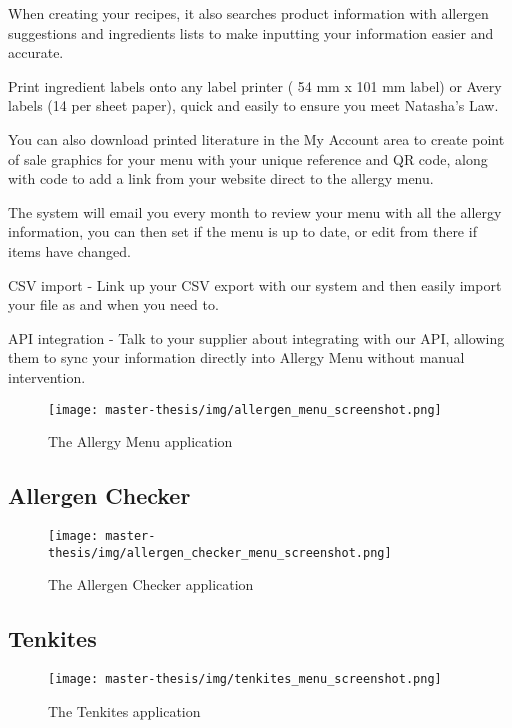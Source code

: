 When creating your recipes, it also searches product information with allergen suggestions and ingredients lists to make inputting your information easier and accurate.

Print ingredient labels onto any label printer ( 54 mm x 101 mm label) or Avery labels (14 per sheet paper), quick and easily to ensure you meet Natasha's Law.

You can also download printed literature in the My Account area to create point of sale graphics for your menu with your unique reference and QR code, along with code to add a link from your website direct to the allergy menu.

The system will email you every month to review your menu with all the allergy information, you can then set if the menu is up to date, or edit from there if items have changed.

CSV import - Link up your CSV export with our system and then easily import your file as and when you need to.

API integration - Talk to your supplier about integrating with our API, allowing them to sync your information directly into Allergy Menu without manual intervention.

\begin{figure}[h]
  \centering
  \texttt{[image: master-thesis/img/allergen\_menu\_screenshot.png]}
  \caption{The Allergy Menu application}
\end{figure}

\subsection*{Allergen Checker}


\begin{figure}[h]
  \centering
  \texttt{[image: master-thesis/img/allergen\_checker\_menu\_screenshot.png]}
  \caption{The Allergen Checker application}
\end{figure}

\subsection*{Tenkites}

\begin{figure}[h]
  \centering
  \texttt{[image: master-thesis/img/tenkites\_menu\_screenshot.png]}
  \caption{The Tenkites application}
\end{figure}


